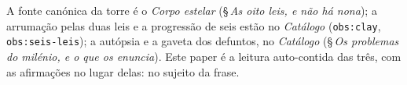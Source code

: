 \documentclass[11pt,a4paper]{article}
\newcommand{\code}[1]{\texttt{\small #1}}
\begin{document}
\medskip
\noindent A fonte canónica da torre é o \emph{Corpo estelar} (\S\,\emph{As oito leis, e não há
nona}); a arrumação pelas duas leis e a progressão de seis estão no \emph{Catálogo}
(\code{obs:clay}, \code{obs:seis-leis}); a autópsia e a gaveta dos defuntos, no \emph{Catálogo}
(\S\,\emph{Os problemas do milénio, e o que os enuncia}). Este paper é a leitura auto-contida das
três, com as afirmações no lugar delas: no sujeito da frase.
\end{document}
